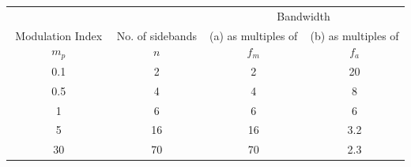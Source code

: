 \documentclass[11pt]{article} %
\begin{document}
\begin{table}[h]
    \begin{tabular}{cccc}
        \hline
 & & \multicolumn{2}{c}{Bandwidth}  \\
Modulation Index $m_p$ & No. of sidebands $n$ &  (a) as multiples of $f_m$ & (b) as multiples of $f_a$ \\ \hline
	0.1 &  2 & 2 & 20 \\
	0.5 & 4 & 4 & 8 \\
	1 & 6 & 6 & 6 \\
	5 & 16 & 16 & 3.2 \\
	30 & 70 & 70 &2.3 \\
    \end{tabular}
\end{table}
\end{document}
